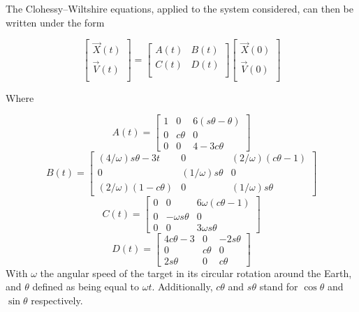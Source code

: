 \documentclass[journal]{IEEEtran}
\begin{document}
The Clohessy–Wiltshire equations, applied to the system considered, can then be written under the form

\begin{equation}
\label{cw}
    \begin{bmatrix}
    \vec{X}(t)\\
    \vec{V}(t)\\
    \end{bmatrix}
    =
    \begin{bmatrix}
    A(t) & B(t)\\
    C(t) & D(t)\\
    \end{bmatrix}
    \begin{bmatrix}
    \vec{X}(0)\\
    \vec{V}(0)\\
    \end{bmatrix}
\end{equation}

Where

\begin{equation*}
    A(t)= \begin{bmatrix}
    1 & 0 & 6(s\theta-\theta)\\
    0 & c \theta & 0 \\
    0 & 0 & 4-3c\theta
    \end{bmatrix}
\end{equation*}
\begin{equation*}    
    B(t)= \begin{bmatrix}
    (4/\omega)s\theta-3t & 0 & (2/\omega)(c\theta-1) \\
    0 & (1/\omega)s\theta & 0 \\
    (2/\omega)(1-c\theta) & 0 & (1/\omega)s\theta
    \end{bmatrix}
\end{equation*}
\begin{equation*}    
    C(t) =  \begin{bmatrix}
    0 & 0 & 6\omega(c\theta-1) \\
    0 & -\omega s\theta & 0 \\
    0 & 0 & 3\omega s\theta \end{bmatrix}
\end{equation*}
\begin{equation*}    
    D(t) =  \begin{bmatrix}
    4c\theta-3 & 0 & -2s\theta \\
    0 & c\theta & 0 \\
    2s\theta & 0 & c\theta \end{bmatrix}
\end{equation*}
With $\omega$ the angular speed of the target in its circular rotation around the Earth, and $\theta$ defined as being equal to $\omega t$. Additionally, $c\theta$ and $s\theta$ stand for $\cos{\theta}$ and $\sin{\theta}$ respectively.
\end{document}
